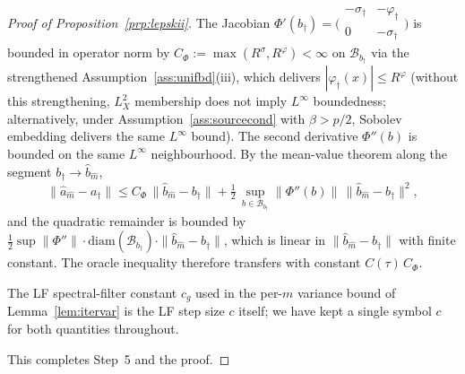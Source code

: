 \begin{proof}[Proof of Proposition~\ref{prp:lepskii}]
The Jacobian
$\Phi'(b_\dagger) = \bigl(\begin{smallmatrix}-\sigma_\dagger & -\varphi_\dagger \\ 0 & -\sigma_\dagger\end{smallmatrix}\bigr)$
is bounded in operator norm by
$C_\Phi := \max(R^\sigma, R^\varphi) < \infty$ on $\mathcal{B}_{b_\dagger}$
via the strengthened Assumption~\ref{ass:unifbd}\textup{(iii)}, %
which delivers $|\varphi_\dagger(x)| \le R^\varphi$ (without this strengthening,
$L^2_X$ membership does not imply $L^\infty$ boundedness; alternatively, under
Assumption~\ref{ass:sourcecond} with $\beta > p/2$, Sobolev embedding
delivers the same $L^\infty$ bound). The second derivative $\Phi''(b)$ is
bounded on the same $L^\infty$ neighbourhood. By the mean-value theorem
along the segment $b_\dagger \to \hat b_{\hat m}$,
\[
\|\hat a_{\hat m} - a_\dagger\|
\le C_\Phi\,\|\hat b_{\hat m} - b_\dagger\|
+ \tfrac12\,\sup_{b \in \mathcal B_{b_\dagger}}\!\|\Phi''(b)\|\,
\|\hat b_{\hat m} - b_\dagger\|^{2},
\]
and the quadratic remainder is bounded by
$\tfrac12\sup\|\Phi''\|\cdot\mathrm{diam}(\mathcal B_{b_\dagger})\cdot
\|\hat b_{\hat m} - b_\dagger\|$, which is linear in
$\|\hat b_{\hat m} - b_\dagger\|$ with finite constant. The oracle
inequality therefore transfers with constant $C(\tau)\,C_\Phi$.

The LF spectral-filter constant $c_g$ used in the per-$m$ variance bound of
Lemma~\ref{lem:itervar} is the LF step size $c$ itself; we have kept a single
symbol $c$ for both quantities throughout. %

This completes Step~5 and the proof.
\end{proof}
